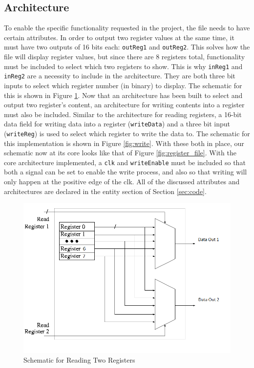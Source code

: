 \documentclass[12pt]{article}
\begin{document}
\subsection{Architecture}
To enable the specific functionality requested in the project, the file needs to have certain attributes. In order to output two register values at the same time, it must have two outputs of 16 bits each: \texttt{outReg1} and \texttt{outReg2}. This solves how the file will display register values, but since there are 8 registers total, functionality must be included to select which two registers to show. This is why \texttt{inReg1} and \texttt{inReg2} are a necessity to include in the architecture. They are both three bit inputs to select which register number (in binary) to display. The schematic for this is shown in Figure \ref{fig:read}. Now that an architecture has been built to select and output two register's content, an architecture for writing contents into a register must also be included. Similar to the architecture for reading registers, a 16-bit data field for writing data into a register (\texttt{writeData}) and a three bit input (\texttt{writeReg}) is used to select which register to write the data to. The schematic for this implementation is shown in Figure \ref{fig:write}. With these both in place, our schematic now at its core looks like that of Figure \ref{fig:register_file}. With the core architecture implemented, a \texttt{clk} and \texttt{writeEnable} must be included so that both a signal can be set to enable the write process, and also so that writing will only happen at the positive edge of the clk. All of the discussed attributes and architectures are declared in the entity section of Section \ref{sec:code}.
\vspace{2cm}
\begin{figure}[H]
\centering
\includegraphics[width=\linewidth]{read-ports}
\caption{Schematic for Reading Two Registers}
\label{fig:read}
\end{figure}
\end{document}
